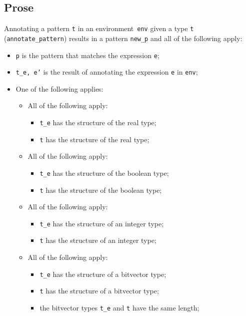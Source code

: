 \documentclass{book}
\begin{document}
\begin{itemize}
    \subsection{Prose}
      Annotating a pattern \texttt{t} in an environment~\texttt{env} given a type \texttt{t} (\texttt{annotate\_pattern}) results in a pattern \texttt{new\_p} and all of the following apply:
      \begin{itemize}
        \item \texttt{p} is the pattern that matches the expression \texttt{e};
        \item \texttt{t\_e, e'} is the result of annotating the expression \texttt{e} in \texttt{env};
        \item One of the following applies:
          \begin{itemize}
            \item All of the following apply:
              \begin{itemize}
                \item \texttt{t\_e} has the structure of the real type;
                \item \texttt{t} has the structure of the real type;
              \end{itemize}
            \item All of the following apply:
              \begin{itemize}
                \item \texttt{t\_e} has the structure of the boolean type;
                \item \texttt{t} has the structure of the boolean type;
              \end{itemize}
            \item All of the following apply:
              \begin{itemize}
                \item \texttt{t\_e} has the structure of an integer type;
                \item \texttt{t} has the structure of an integer type;
              \end{itemize}
            \item All of the following apply:
              \begin{itemize}
                \item \texttt{t\_e} has the structure of a bitvector type;
                \item \texttt{t} has the structure of a bitvector type;
                \item the bitvector types \texttt{t\_e} and \texttt{t} have the same length;

\end{itemize}
\end{itemize}
\end{itemize}
\end{itemize}
\end{document}
